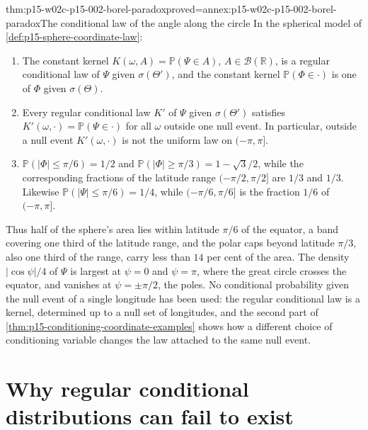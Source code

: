 \begin{hbcorollary}{thm:p15-w02c-p15-002-borel-paradox}{proved=annex:p15-w02c-p15-002-borel-paradox}{The conditional law of the angle along the circle}
In the spherical model of \cref{def:p15-sphere-coordinate-law}:
\begin{enumerate}
\item The constant kernel \(K(\omega,A)=\mathbb P(\Psi\in A)\),
      \(A\in\mathcal B(\mathbb R)\), is a regular conditional law of
      \(\Psi\) given \(\sigma(\Theta')\), and the constant kernel
      \(\mathbb P(\Phi\in\cdot)\) is one of \(\Phi\) given
      \(\sigma(\Theta)\).
\item Every regular conditional law \(K'\) of \(\Psi\) given
      \(\sigma(\Theta')\) satisfies \(K'(\omega,\cdot)=\mathbb P(\Psi\in\cdot)\)
      for all \(\omega\) outside one null event. In particular, outside a
      null event \(K'(\omega,\cdot)\) is not the uniform law on
      \((-\pi,\pi]\).
\item \(\mathbb P(|\Phi|\leq\pi/6)=1/2\) and
      \(\mathbb P(|\Phi|\geq\pi/3)=1-\sqrt3/2\), while the corresponding
      fractions of the latitude range \((-\pi/2,\pi/2]\) are \(1/3\) and
      \(1/3\). Likewise \(\mathbb P(|\Psi|\leq\pi/6)=1/4\), while
      \((-\pi/6,\pi/6]\) is the fraction \(1/6\) of \((-\pi,\pi]\).
\end{enumerate}
\end{hbcorollary}

Thus half of the sphere's area lies within latitude \(\pi/6\) of the
equator, a band covering one third of the latitude range, and the polar
caps beyond latitude \(\pi/3\), also one third of the range, carry less
than \(14\) per cent of the area. The density \(|\cos\psi|/4\) of
\(\Psi\) is largest at \(\psi=0\) and \(\psi=\pi\), where the great circle
crosses the equator, and vanishes at \(\psi=\pm\pi/2\), the poles. No
conditional probability given the null event of a single longitude has
been used: the regular conditional law is a kernel, determined up to a
null set of longitudes, and the second part of
\cref{thm:p15-conditioning-coordinate-examples} shows how a different
choice of conditioning variable changes the law attached to the same null
event.

\section{Why regular conditional distributions can fail to exist}
\label{sec:p15-w02c-p15-002-rcd-existence}

